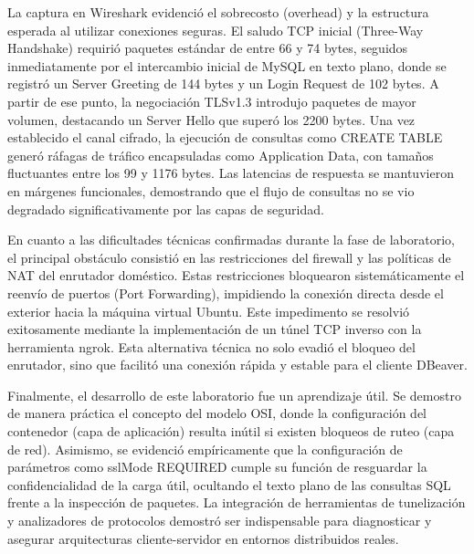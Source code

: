 \documentclass[10pt,a4paper]{article}
\begin{document}
La captura en Wireshark evidenció el sobrecosto (overhead) y la estructura esperada al utilizar conexiones seguras. El saludo TCP inicial (Three-Way Handshake) requirió paquetes estándar de entre 66 y 74 bytes, seguidos inmediatamente por el intercambio inicial de MySQL en texto plano, donde se registró un Server Greeting de 144 bytes y un Login Request de 102 bytes. A partir de ese punto, la negociación TLSv1.3 introdujo paquetes de mayor volumen, destacando un Server Hello que superó los 2200 bytes. Una vez establecido el canal cifrado, la ejecución de consultas como CREATE TABLE generó ráfagas de tráfico encapsuladas como Application Data, con tamaños fluctuantes entre los 99 y 1176 bytes. Las latencias de respuesta se mantuvieron en márgenes funcionales, demostrando que el flujo de consultas no se vio degradado significativamente por las capas de seguridad.

En cuanto a las dificultades técnicas confirmadas durante la fase de laboratorio, el principal obstáculo consistió en las restricciones del firewall y las políticas de NAT del enrutador doméstico. Estas restricciones bloquearon sistemáticamente el reenvío de puertos (Port Forwarding), impidiendo la conexión directa desde el exterior hacia la máquina virtual Ubuntu. Este impedimento se resolvió exitosamente mediante la implementación de un túnel TCP inverso con la herramienta ngrok. Esta alternativa técnica no solo evadió el bloqueo del enrutador, sino que facilitó una conexión rápida y estable para el cliente DBeaver.

Finalmente, el desarrollo de este laboratorio fue un aprendizaje útil. Se demostro de manera práctica el concepto del modelo OSI, donde la configuración del contenedor (capa de aplicación) resulta inútil si existen bloqueos de ruteo (capa de red). Asimismo, se evidenció empíricamente que la configuración de parámetros como sslMode REQUIRED cumple su función de resguardar la confidencialidad de la carga útil, ocultando el texto plano de las consultas SQL frente a la inspección de paquetes. La integración de herramientas de tunelización y analizadores de protocolos demostró ser indispensable para diagnosticar y asegurar arquitecturas cliente-servidor en entornos distribuidos reales.
\end{document}
